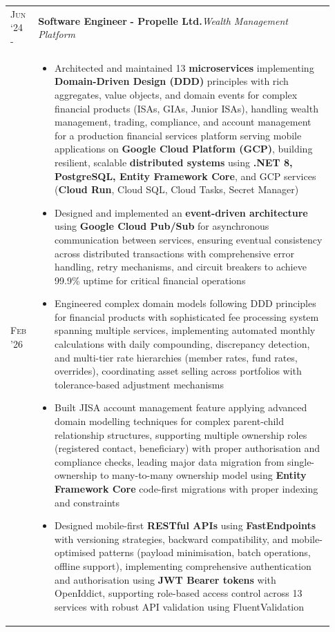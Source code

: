 \documentclass[a4paper,10pt]{extarticle} %
\begin{document}
{\begin{longtable}{>{\raggedright\arraybackslash}p{0.08\linewidth} | >{\raggedright\arraybackslash}p{0.85\linewidth}}
\newpage
\textsc{Jun ‘24 -} & \textbf{Software Engineer} \textbf{ - Propelle Ltd.}\hfill\textit{Wealth Management Platform}\\
\textsc{Feb '26} & \parbox[t]{\linewidth}{
\vspace{-7pt}
\begin{itemize}[leftmargin=*, itemsep=3pt]
    \item Architected and maintained 13 \textbf{microservices} implementing \textbf{Domain-Driven Design (DDD)} principles with rich aggregates, value objects, and domain events for complex financial products (ISAs, GIAs, Junior ISAs), handling wealth management, trading, compliance, and account management for a production financial services platform serving mobile applications on \textbf{Google Cloud Platform (GCP)}, building resilient, scalable \textbf{distributed systems} using \textbf{.NET 8, PostgreSQL, Entity Framework Core}, and GCP services (\textbf{Cloud Run}, Cloud SQL, Cloud Tasks, Secret Manager)
    \item Designed and implemented an \textbf{event-driven architecture} using \textbf{Google Cloud Pub/Sub} for asynchronous communication between services, ensuring eventual consistency across distributed transactions with comprehensive error handling, retry mechanisms, and circuit breakers to achieve 99.9\% uptime for critical financial operations
    \item Engineered complex domain models following DDD principles for financial products with sophisticated fee processing system spanning multiple services, implementing automated monthly calculations with daily compounding, discrepancy detection, and multi-tier rate hierarchies (member rates, fund rates, overrides), coordinating asset selling across portfolios with tolerance-based adjustment mechanisms
    \item Built JISA account management feature applying advanced domain modelling techniques for complex parent-child relationship structures, supporting multiple ownership roles (registered contact, beneficiary) with proper authorisation and compliance checks, leading major data migration from single-ownership to many-to-many ownership model using \textbf{Entity Framework Core} code-first migrations with proper indexing and constraints
    \item Designed mobile-first \textbf{RESTful APIs} using \textbf{FastEndpoints} with versioning strategies, backward compatibility, and mobile-optimised patterns (payload minimisation, batch operations, offline support), implementing comprehensive authentication and authorisation using \textbf{JWT Bearer tokens} with OpenIddict, supporting role-based access control across 13 services with robust API validation using FluentValidation

\end{itemize}}
\end{longtable}}
\end{document}

